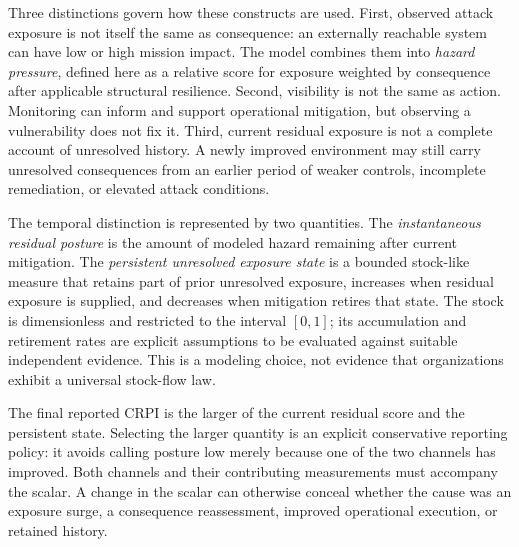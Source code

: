 \documentclass[11pt]{article}
\begin{document}
Three distinctions govern how these constructs are used. First, observed attack
exposure is not itself the same as consequence: an externally reachable system can
have low or high mission impact. The model combines them into \emph{hazard pressure},
defined here as a relative score for exposure weighted by consequence after applicable
structural resilience. Second, visibility is not the same as action. Monitoring can
inform and support operational mitigation, but observing a vulnerability does not fix it.
Third, current residual exposure is not a complete account of unresolved history.
A newly improved environment may still carry unresolved consequences from an earlier
period of weaker controls, incomplete remediation, or elevated attack conditions.

The temporal distinction is represented by two quantities. The \emph{instantaneous
residual posture} is the amount of modeled hazard remaining after current mitigation.
The \emph{persistent unresolved exposure state} is a bounded stock-like measure that
retains part of prior unresolved exposure, increases when residual exposure is supplied,
and decreases when mitigation retires that state. The stock is dimensionless and
restricted to the interval $[0,1]$; its accumulation and retirement rates are explicit
assumptions to be evaluated against suitable independent evidence. This is a modeling
choice, not evidence that organizations exhibit a universal stock-flow law.

The final reported CRPI is the larger of the current residual score and the persistent
state. Selecting the larger quantity is an explicit conservative reporting policy:
it avoids calling posture low merely because one of the two channels has improved.
Both channels and their contributing measurements must accompany the scalar. A change
in the scalar can otherwise conceal whether the cause was an exposure surge, a
consequence reassessment, improved operational execution, or retained history.
\end{document}
